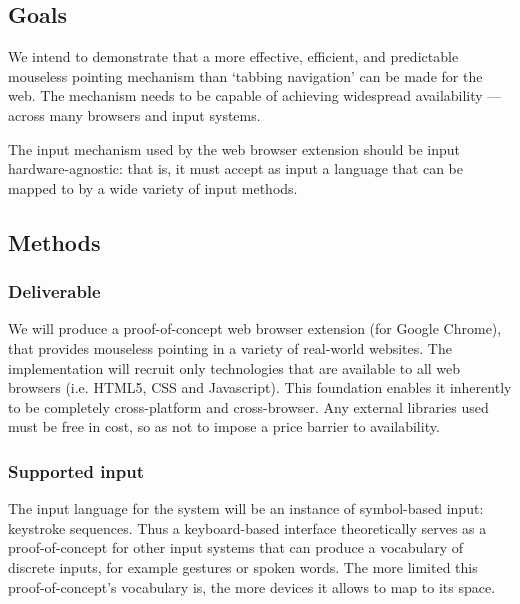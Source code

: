 \documentclass[11pt,openright,a4paper]{report}
\begin{document}
\subsection{Goals}
We intend to demonstrate that a more effective, efficient, and predictable mouseless pointing mechanism than `tabbing navigation' can be made for the web. The mechanism needs to be capable of achieving widespread availability --- across many browsers and input systems.

The input mechanism used by the web browser extension should be input hardware-agnostic: that is, it must accept as input a language that can be mapped to by a wide variety of input methods.

\subsection{Methods}
\subsubsection{Deliverable}
We will produce a proof-of-concept web browser extension (for Google Chrome), that provides mouseless pointing in a variety of real-world websites. The implementation will recruit only technologies that are available to all web browsers (i.e. HTML5, CSS and Javascript). This foundation enables it inherently to be completely cross-platform and cross-browser. Any external libraries used must be free in cost, so as not to impose a price barrier to availability.

\subsubsection{Supported input}
The input language for the system will be an instance of symbol-based input: keystroke sequences. Thus a keyboard-based interface theoretically serves as a proof-of-concept for other input systems that can produce a vocabulary of discrete inputs, for example gestures or spoken words. The more limited this proof-of-concept's vocabulary is, the more devices it allows to map to its space.
\end{document}
